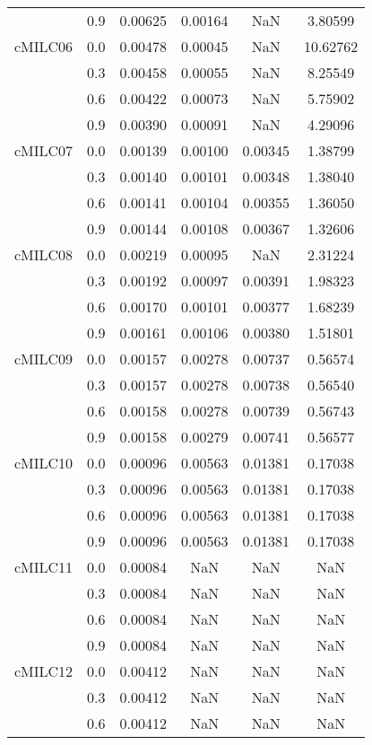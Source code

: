 \begin{longtable}{cccccc}
        & 0.9 & 0.00625 & 0.00164 & NaN & 3.80599 \\
cMILC06 & 0.0 & 0.00478 & 0.00045 & NaN & 10.62762 \\
        & 0.3 & 0.00458 & 0.00055 & NaN & 8.25549 \\
        & 0.6 & 0.00422 & 0.00073 & NaN & 5.75902 \\
        & 0.9 & 0.00390 & 0.00091 & NaN & 4.29096 \\
cMILC07 & 0.0 & 0.00139 & 0.00100 & 0.00345 & 1.38799 \\
        & 0.3 & 0.00140 & 0.00101 & 0.00348 & 1.38040 \\
        & 0.6 & 0.00141 & 0.00104 & 0.00355 & 1.36050 \\
        & 0.9 & 0.00144 & 0.00108 & 0.00367 & 1.32606 \\
cMILC08 & 0.0 & 0.00219 & 0.00095 & NaN & 2.31224 \\
        & 0.3 & 0.00192 & 0.00097 & 0.00391 & 1.98323 \\
        & 0.6 & 0.00170 & 0.00101 & 0.00377 & 1.68239 \\
        & 0.9 & 0.00161 & 0.00106 & 0.00380 & 1.51801 \\
cMILC09 & 0.0 & 0.00157 & 0.00278 & 0.00737 & 0.56574 \\
        & 0.3 & 0.00157 & 0.00278 & 0.00738 & 0.56540 \\
        & 0.6 & 0.00158 & 0.00278 & 0.00739 & 0.56743 \\
        & 0.9 & 0.00158 & 0.00279 & 0.00741 & 0.56577 \\
cMILC10 & 0.0 & 0.00096 & 0.00563 & 0.01381 & 0.17038 \\
        & 0.3 & 0.00096 & 0.00563 & 0.01381 & 0.17038 \\
        & 0.6 & 0.00096 & 0.00563 & 0.01381 & 0.17038 \\
        & 0.9 & 0.00096 & 0.00563 & 0.01381 & 0.17038 \\
cMILC11 & 0.0 & 0.00084 & NaN & NaN & NaN \\
        & 0.3 & 0.00084 & NaN & NaN & NaN \\
        & 0.6 & 0.00084 & NaN & NaN & NaN \\
        & 0.9 & 0.00084 & NaN & NaN & NaN \\
cMILC12 & 0.0 & 0.00412 & NaN & NaN & NaN \\
        & 0.3 & 0.00412 & NaN & NaN & NaN \\
        & 0.6 & 0.00412 & NaN & NaN & NaN \\

\end{longtable}
